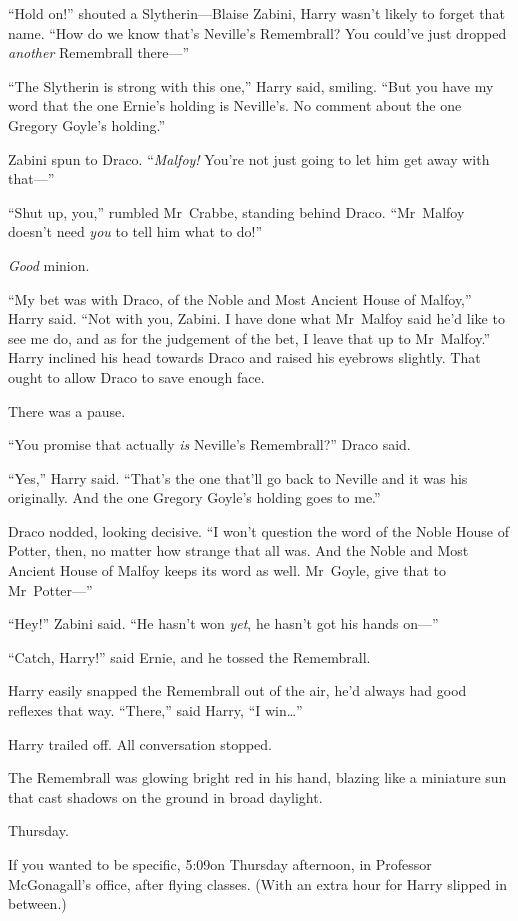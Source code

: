 “Hold on!” shouted a Slytherin—Blaise Zabini, Harry wasn’t likely to forget that name.
“How do we know that’s Neville’s Remembrall? You could’ve just dropped \emph{another} Remembrall there—”

“The Slytherin is strong with this one,” Harry said, smiling.
“But you have my word that the one Ernie’s holding is Neville’s. No comment about the one Gregory Goyle’s holding.”

Zabini spun to Draco. “\emph{Malfoy!} You’re not just going to let him get away with that—”

“Shut up, you,” rumbled Mr~Crabbe, standing behind Draco.
“Mr~Malfoy doesn’t need \emph{you} to tell him what to do!”

\emph{Good} minion.

“My bet was with Draco, of the Noble and Most Ancient House of Malfoy,” Harry said.
“Not with you, Zabini. I have done what Mr~Malfoy said he’d like to see me do, and as for the judgement of the bet, I leave that up to Mr~Malfoy.” Harry inclined his head towards Draco and raised his eyebrows slightly. That ought to allow Draco to save enough face.

There was a pause.

“You promise that actually \emph{is} Neville’s Remembrall?” Draco said.

“Yes,” Harry said.
“That’s the one that’ll go back to Neville and it was his originally. And the one Gregory Goyle’s holding goes to me.”

Draco nodded, looking decisive.
“I won’t question the word of the Noble House of Potter, then, no matter how strange that all was. And the Noble and Most Ancient House of Malfoy keeps its word as well. Mr~Goyle, give that to Mr~Potter—”

“Hey!” Zabini said.
“He hasn’t won \emph{yet}, he hasn’t got his hands on—”

“Catch, Harry!” said Ernie, and he tossed the Remembrall.

Harry easily snapped the Remembrall out of the air, he’d always had good reflexes that way.
“There,” said Harry,
“I win…”

Harry trailed off. All conversation stopped.

The Remembrall was glowing bright red in his hand, blazing like a miniature sun that cast shadows on the ground in broad daylight.

\later

Thursday.

If you wanted to be specific, 5:09\pm on Thursday afternoon, in Professor McGonagall’s office, after flying classes. (With an extra hour for Harry slipped in between.)

